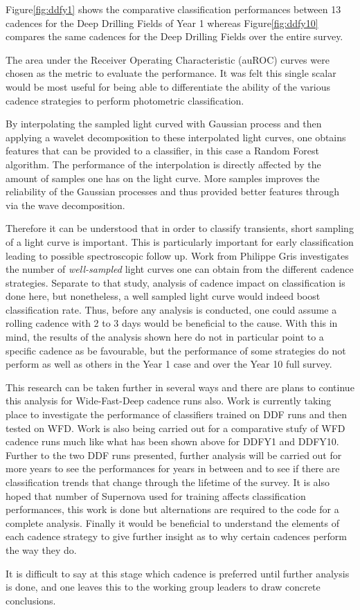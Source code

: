 Figure\ref{fig:ddfy1} shows the
comparative classification performances between 13 cadences for the Deep
Drilling Fields of Year 1 whereas Figure\ref{fig:ddfy10} compares the same
cadences for the Deep Drilling Fields over the entire survey.

The area under the Receiver Operating Characteristic (auROC) curves were chosen as the metric
to evaluate the performance. It was felt this single scalar would be most useful
for being able to differentiate the ability of the various cadence strategies
to perform photometric classification.

By interpolating the sampled light curved with Gaussian process and then applying a
wavelet decomposition to these interpolated light curves, one obtains features
that can be provided to a classifier, in this case a Random Forest algorithm.
The performance of the interpolation is directly affected by the amount of
samples one has on the light curve. More samples improves the reliability of the
Gaussian processes and thus provided better features through via the wave decomposition.

Therefore it can be understood that in order to classify transients, short sampling of a light
curve is important. This is particularly important for early classification
leading to possible spectroscopic follow up. Work from Philippe Gris
investigates
the number of \emph{well-sampled} light curves one can obtain from the different
cadence strategies. Separate to that study, analysis of cadence impact on
classification is done here, but nonetheless, a well sampled light curve would
indeed boost classification rate. Thus, before any analysis is conducted, one
could assume a rolling cadence with 2 to 3 days would be beneficial to the
cause.
With this in mind, the results of the analysis shown here do not in particular
point to a specific cadence as be favourable, but the performance of some
strategies do not perform as well as others in the Year 1 case and over the
Year 10 full survey.

This research can be taken further in several ways and there are plans to
continue this analysis for Wide-Fast-Deep cadence runs also. Work is currently
taking place to investigate the performance of classifiers trained on DDF runs
and then tested on WFD. Work is also being carried out for a comparative stufy
of WFD cadence runs much like what has been shown above for DDFY1 and DDFY10.
Further to the two DDF runs presented, further analysis will be carried out for
more years to see the performances for years in between and to see if there
are classification trends that change through the lifetime of the survey. It is
also hoped that number of Supernova used for training affects classification
performances, this work is done but alternations are required to the code for a complete
analysis. Finally it would be beneficial to understand the elements of each cadence
strategy to give further insight as to why certain cadences perform the way they do.

It is difficult to say at this stage which cadence is preferred until further
analysis is done, and one leaves this to the working group leaders to draw
concrete conclusions.
